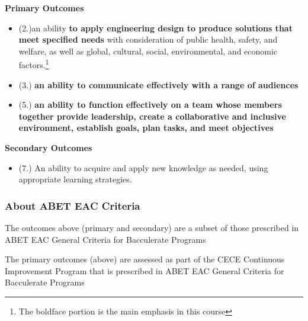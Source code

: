 \documentclass[12pt]{article}
\begin{document}
\textbf{Primary Outcomes}
\begin{itemize}
\item (2.)an ability \textbf{to apply engineering design to produce solutions that meet specified needs}
with consideration of public health, safety, and welfare, as well as global, cultural, social,
environmental, and economic factors.\footnote{The boldface portion is the main emphasis in this course}
\item (3.) \textbf{an ability to communicate effectively with a range of audiences}
\item (5.) \textbf{an ability to function effectively on a team whose members together provide
leadership, create a collaborative and inclusive environment, establish goals,
plan tasks, and meet objectives}
\end{itemize}

\textbf{Secondary Outcomes}

\begin{itemize}
\item (7.) An ability to acquire and apply new knowledge as needed, using appropriate learning strategies.
\end{itemize}

\subsubsection*{{About ABET EAC Criteria}}

The outcomes above (primary and secondary) are a subset of those prescribed in ABET EAC General Criteria for Bacculerate Programs \citep{ABET2024}


The primary outcomes (above) are assessed as part of the CECE Continuous Improvement Program that is prescribed in ABET EAC General Criteria for Bacculerate Programs \citep{ABET2024}

\end{document}
